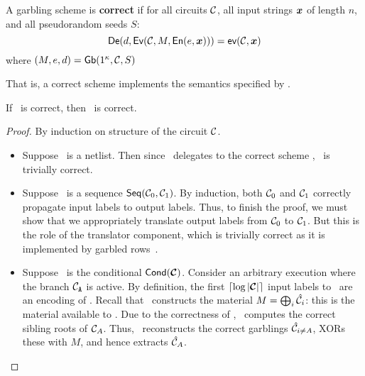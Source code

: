 \begin{definition}[Correctness]\label{def:correct}
  A garbling scheme is \textbf{correct} if for
  all circuits $\mathcal C$,
  all input strings $\cirinp$ of length $n$,
  and all pseudorandom seeds $S$:
  \[
    \gDe(d, \gEv(\cir, \mat,\gEn(e,\cirinp))) = \gev(\cir,\cirinp)
  \]
  where $(M, e, d) = \textsf{Gb}(1^\kappa,\mathcal C,S)$
\end{definition}

That is, a correct scheme implements the semantics specified by \gev.

\begin{theorem}\label{theorem:correctness}
  If \underscheme\ is correct, then \ourscheme\ is correct.
\end{theorem}
\begin{proof}
  By induction on structure of the circuit $\mathcal C$.
  \begin{itemize}
    \item Suppose \cir\ is a netlist. Then since \ourscheme\ delegates
      to the correct scheme \underscheme, \ourscheme\ is trivially
      correct.
    \item Suppose \cir\ is a sequence $\textsf{Seq}(\mathcal C_0, \mathcal C_1)$.
      By induction, both $\mathcal C_0$ and $\mathcal C_1$ correctly propagate
      input labels to output labels.
      Thus, to finish the proof, we must show that we appropriately
      translate output labels from $\mathcal C_0$ to $\mathcal C_1$. But this is
      the role of the translator component, which is trivially correct
      as it is implemented by garbled rows~\HK.
    \item Suppose \cir\ is the conditional $\conditional(\vec \cir)$.
      Consider an arbitrary execution where the branch $\mathcal C_{\mathtt{A}}$ is
      active.
      By definition, the first $\lceil \log |\vec \cir| \rceil$ input
      labels to \gEv\ are an encoding of \act.
      Recall that \gGb\ constructs the material $M = \bigoplus_i
      \hat{\mathcal C}_i$: this is the material available to \gEv.
      Due to the correctness of \gadget, \gEv\ computes the correct
      sibling roots of $\mathcal C_A$. Thus, \evcond\ reconstructs the correct
      garblings $\hat{\mathcal C}_{i \neq A}$, XORs these with $M$, and hence
      extracts $\hat{\mathcal C}_A$.


\end{itemize}
\end{proof}
